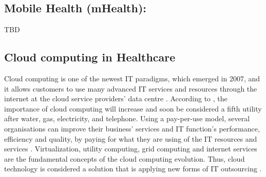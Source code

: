 \subsection{Mobile Health (mHealth):}
TBD

\subsection{Cloud computing in Healthcare}

Cloud computing is one of the newest IT paradigms, which emerged in 2007, and it allows customers to use many advanced IT services and resources through the internet at the cloud service providers’ data centre \cite{Sultan2014}. According to \citet{Buyya2009}, the importance of cloud computing will increase and soon be considered a fifth utility after water, gas, electricity, and telephone. Using a pay-per-use model, several organisations can improve their business’ services and IT function’s performance, efficiency and quality, by paying for what they are using of the IT resources and services \cite{Abdollahzadehgan2013}. Virtualization, utility computing, grid computing and internet services are the fundamental concepts of the cloud computing evolution. Thus, cloud technology is considered a solution that is applying new forms of IT outsourcing \cite{tashkandi2015cloud,Chang2013}.

